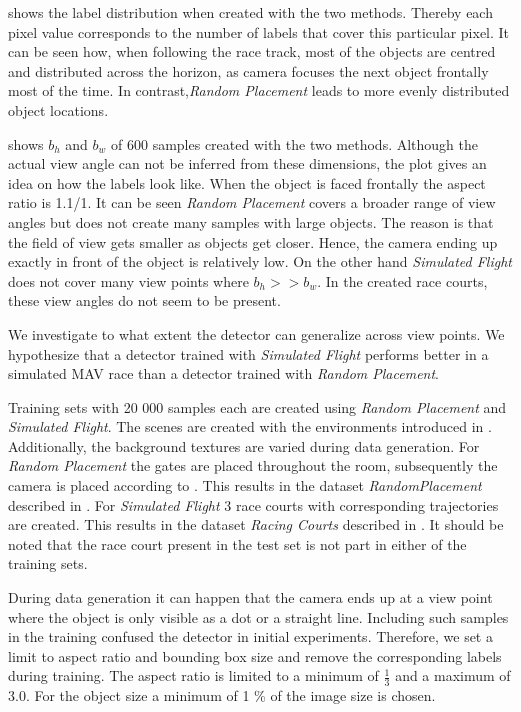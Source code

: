  shows the label distribution when created with the two methods. Thereby each pixel value corresponds to the number of labels that cover this particular pixel. It can be seen how, when following the race track, most of the objects are centred and distributed across the horizon, as camera focuses the next object frontally most of the time. In contrast,\textit{Random Placement} leads to more evenly distributed object locations. 

 shows $b_h$ and $b_w$ of 600 samples created with the two methods. Although the actual view angle can not be inferred from these dimensions, the plot gives an idea on how the labels look like. When the object is faced frontally the aspect ratio is 1.1/1. It can be seen  \textit{Random Placement} covers a broader range of view angles but does not create many samples with large objects. The reason is that the field of view gets smaller as objects get closer. Hence, the camera ending up exactly in front of the object is relatively low. On the other hand \textit{Simulated Flight} does not cover many view points where $b_h >> b_w$. In the created race courts, these view angles do not seem to be present.

We investigate to what extent the detector can generalize across view points. We hypothesize that a detector trained with \textit{Simulated Flight} performs better in a simulated \ac{MAV} race than a detector trained with \textit{Random Placement}. 

Training sets with 20 000 samples each are created using \textit{Random Placement} and \textit{Simulated Flight}. The scenes are created with the environments introduced in . Additionally, the background textures are varied during data generation. For \textit{Random Placement} the gates are placed throughout the room, subsequently the camera is placed according to . This results in the dataset \textit{RandomPlacement} described in . For \textit{Simulated Flight} 3 race courts with corresponding trajectories are created. This results in the dataset \textit{Racing Courts} described in . It should be noted that the race court present in the test set is not part in either of the training sets. 

During data generation it can happen that the camera ends up at a view point where the object is only visible as a dot or a straight line. Including such samples in the training confused the detector in initial experiments. Therefore, we set a limit to aspect ratio and bounding box size and remove the corresponding labels during training. The aspect ratio is limited to a minimum  of $\frac{1}{3}$ and a maximum of 3.0. For the object size a minimum of 1 \% of the image size is chosen.



